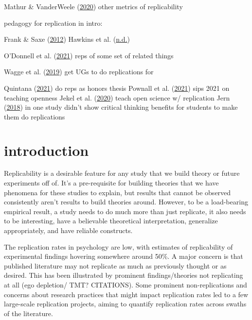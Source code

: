 \documentclass[
  english,
  a4paper,
]{article}
\begin{document}
Mathur \& VanderWeele (\protect\hyperlink{ref-mathur2020}{2020}) other metrics of replicability

pedagogy for replication in intro:

Frank \& Saxe (\protect\hyperlink{ref-frank2012}{2012})
Hawkins et al. (\protect\hyperlink{ref-hawkins}{n.d.})

O'Donnell et al. (\protect\hyperlink{ref-odonnell2021}{2021}) reps of some set of related things

Wagge et al. (\protect\hyperlink{ref-wagge2019}{2019}) get UGs to do replications for

Quintana (\protect\hyperlink{ref-quintana2021}{2021}) do reps as honors thesis
Pownall et al. (\protect\hyperlink{ref-pownall2021}{2021}) sips 2021 on teaching openness
Jekel et al. (\protect\hyperlink{ref-jekel2020}{2020}) teach open science w/ replication
Jern (\protect\hyperlink{ref-jern2018}{2018}) in one study didn't show critical thinking benefits for students to make them do replications

\hypertarget{introduction}{%
\section{introduction}\label{introduction}}

Replicability is a desirable feature for any study that we build theory or future experiments off of. It's a pre-requisite for building theories that we have phenomena for these studies to explain, but results that cannot be observed consistently aren't results to build theories around. However, to be a load-bearing empirical result, a study needs to do much more than just replicate, it also needs to be interesting, have a believable theoretical interpretation, generalize appropriately, and have reliable constructs.

The replication rates in psychology are low, with estimates of replicability of experimental findings hovering somewhere around 50\%. A major concern is that published literature may not replicate as much as previously thought or as desired. This has been illustrated by prominent findings/theories not replicating at all (ego depletion/ TMT? CITATIONS). Some prominent non-replications and concerns about research practices that might impact replication rates led to a few large-scale replication projects, aiming to quantify replication rates across swaths of the literature.
\end{document}
